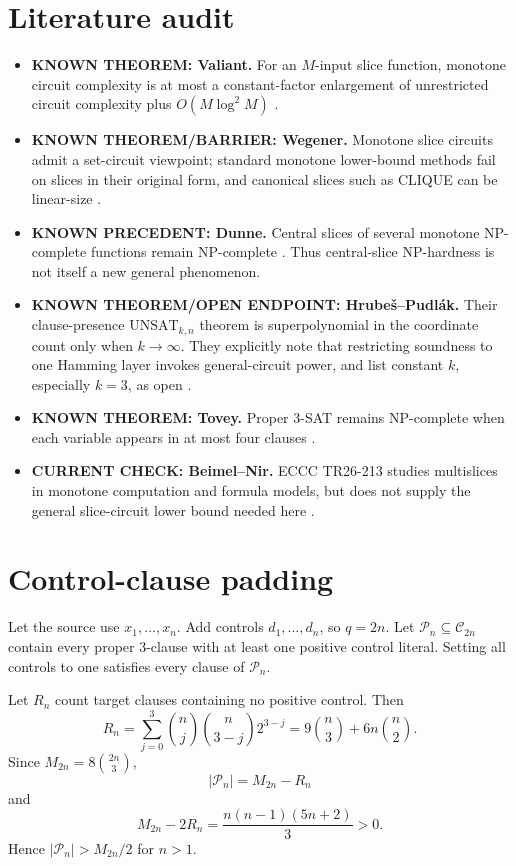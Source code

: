 \documentclass[11pt]{article}
\begin{document}
\section{Literature audit}
\begin{itemize}
\item[] \textbf{KNOWN THEOREM: Valiant.} For an \(M\)-input slice function, monotone circuit complexity is at most a constant-factor enlargement of unrestricted circuit complexity plus \(O(M\log^2 M)\) \cite{Valiant1986}.
\item[] \textbf{KNOWN THEOREM/BARRIER: Wegener.} Monotone slice circuits admit a set-circuit viewpoint; standard monotone lower-bound methods fail on slices in their original form, and canonical slices such as CLIQUE can be linear-size \cite{Wegener1985}.
\item[] \textbf{KNOWN PRECEDENT: Dunne.} Central slices of several monotone NP-complete functions remain NP-complete \cite{Dunne1986}. Thus central-slice NP-hardness is not itself a new general phenomenon.
\item[] \textbf{KNOWN THEOREM/OPEN ENDPOINT: Hrube\v{s}--Pudl\'ak.} Their clause-presence \(\mathrm{UNSAT}_{k,n}\) theorem is superpolynomial in the coordinate count only when \(k\to\infty\). They explicitly note that restricting soundness to one Hamming layer invokes general-circuit power, and list constant \(k\), especially \(k=3\), as open \cite{HrubesPudlak2017}.
\item[] \textbf{KNOWN THEOREM: Tovey.} Proper 3-SAT remains NP-complete when each variable appears in at most four clauses \cite{Tovey1984}.
\item[] \textbf{CURRENT CHECK: Beimel--Nir.} ECCC TR26-213 studies multislices in monotone computation and formula models, but does not supply the general slice-circuit lower bound needed here \cite{BeimelNir2026}.
\end{itemize}

\section{Control-clause padding}
Let the source use \(x_1,\ldots,x_n\). Add controls \(d_1,\ldots,d_n\), so \(q=2n\). Let \(\mathcal P_n\subseteq\mathcal C_{2n}\) contain every proper 3-clause with at least one positive control literal. Setting all controls to one satisfies every clause of \(\mathcal P_n\).

Let \(R_n\) count target clauses containing no positive control. Then
\[
R_n=\sum_{j=0}^3\binom nj\binom n{3-j}2^{3-j}
=9\binom n3+6n\binom n2.
\]
Since \(M_{2n}=8\binom{2n}{3}\),
\[
|\mathcal P_n|=M_{2n}-R_n
\]
and
\[
M_{2n}-2R_n=\frac{n(n-1)(5n+2)}3>0.
\]
Hence \(|\mathcal P_n|>M_{2n}/2\) for \(n>1\).
\end{document}

